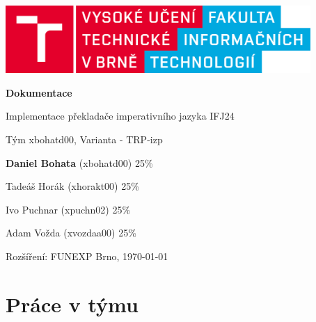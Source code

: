 \documentclass[a4paper, 12pt]{article}
\begin{document}
    \begin{titlepage}
        \begin{center}
            \includegraphics[width=0.87\textwidth]{images/logo_cz.png}
            \vspace*{6cm}

            \Huge{\textbf{Dokumentace}}
            \vspace{0.5cm}
            
            \LARGE{Implementace překladače imperativního jazyka IFJ24}
            \vspace{0.5cm}
            
            \Large{Tým xbohatd00, Varianta - TRP-izp}
            \vspace{2.5cm}
            
            \large{\textbf{Daniel Bohata} (xbohatd00) 25\%}
            \vspace{0.1cm}
            
            \large{Tadeáš Horák (xhorakt00) 25\%}
            \vspace{0.1cm}
            
            \large{Ivo Puchnar (xpuchn02) 25\%}
            \vspace{0.1cm}
            
            \large{Adam Vožda (xvozdaa00) 25\%}
            \vspace{0.1cm}
            
           \vfill
		   \begin{flushleft} 
		   \large
		   Rozšíření: FUNEXP
		   \hfill
		   Brno, \today
		   \end{flushleft}
        \end{center}
    \end{titlepage}

\pagestyle{fancy}

\newpage
\tableofcontents


\newpage
{}
\section{Práce v týmu}
\end{document}
